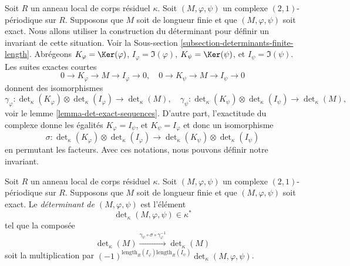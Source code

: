 \noindent
Soit $R$ un anneau local de corps résiduel $\kappa$.
Soit $(M, \varphi, \psi)$ un complexe $(2, 1)$-périodique sur $R$.
Supposons que $M$ soit de longueur finie et que $(M, \varphi, \psi)$ soit
exact. Nous allons utiliser la construction du déterminant pour définir
un invariant de cette situation. Voir la
Sous-section \ref{subsection-determinants-finite-length}.
Abrégeons
$K_\varphi = \Ker(\varphi)$,
$I_\varphi = \Im(\varphi)$,
$K_\psi = \Ker(\psi)$, et
$I_\psi = \Im(\psi)$.
Les suites exactes courtes
$$
0 \to K_\varphi \to M \to I_\varphi \to 0, \quad
0 \to K_\psi \to M \to I_\psi \to 0
$$
donnent des isomorphismes
$$
\gamma_\varphi :
\det\nolimits_\kappa(K_\varphi)
\otimes
\det\nolimits_\kappa(I_\varphi)
\longrightarrow
\det\nolimits_\kappa(M), \quad
\gamma_\psi :
\det\nolimits_\kappa(K_\psi)
\otimes
\det\nolimits_\kappa(I_\psi)
\longrightarrow
\det\nolimits_\kappa(M),
$$
voir le lemme \ref{lemma-det-exact-sequences}.
D'autre part, l'exactitude du complexe donne les égalités
$K_\varphi = I_\psi$, et $K_\psi = I_\varphi$
et donc un isomorphisme
$$
\sigma :
\det\nolimits_\kappa(K_\varphi)
\otimes
\det\nolimits_\kappa(I_\varphi)
\longrightarrow
\det\nolimits_\kappa(K_\psi)
\otimes
\det\nolimits_\kappa(I_\psi)
$$
en permutant les facteurs. Avec ces notations, nous pouvons définir notre invariant.

\begin{definition}
\label{definition-periodic-determinant}
Soit $R$ un anneau local de corps résiduel $\kappa$.
Soit $(M, \varphi, \psi)$ un complexe $(2, 1)$-périodique sur $R$.
Supposons que $M$ soit de longueur finie et que $(M, \varphi, \psi)$ soit
exact. Le {\it déterminant de $(M, \varphi, \psi)$} est
l'élément
$$
\det\nolimits_\kappa(M, \varphi, \psi) \in \kappa^*
$$
tel que la composée
$$
\det\nolimits_\kappa(M)
\xrightarrow{\gamma_\psi \circ \sigma \circ \gamma_\varphi^{-1}}
\det\nolimits_\kappa(M)
$$
soit la multiplication par
$(-1)^{\text{length}_R(I_\varphi)\text{length}_R(I_\psi)}
\det\nolimits_\kappa(M, \varphi, \psi)$.
\end{definition}

